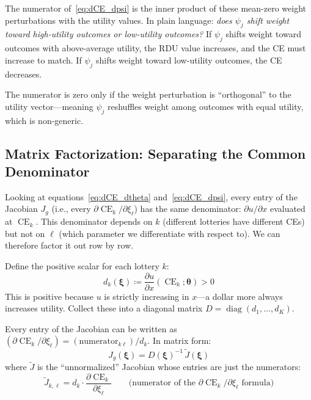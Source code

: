 \documentclass[11pt,a4paper]{article}
\theoremstyle{definition}
\newcommand{\btheta}{\boldsymbol{\theta}}
\newcommand{\bxi}{\boldsymbol{\xi}}
\DeclareMathOperator{\CE}{CE}
\DeclareMathOperator{\diag}{diag}
\begin{document}
The numerator of~\eqref{eq:dCE_dpsi} is the inner product of these
mean-zero weight perturbations with the utility values. In plain language:
\emph{does $\psi_j$ shift weight toward high-utility outcomes or low-utility
outcomes?} If $\psi_j$ shifts weight toward outcomes with above-average
utility, the RDU value increases, and the CE must increase to match. If
$\psi_j$ shifts weight toward low-utility outcomes, the CE decreases.

The numerator is zero only if the weight perturbation is ``orthogonal'' to
the utility vector---meaning $\psi_j$ reshuffles weight among outcomes with
equal utility, which is non-generic.


\subsection{Matrix Factorization: Separating the Common Denominator}

Looking at equations~\eqref{eq:dCE_dtheta} and~\eqref{eq:dCE_dpsi}, every
entry of the Jacobian $J_g$ (i.e., every $\partial \CE_k / \partial \xi_\ell$)
has the same denominator: $\partial u / \partial x$ evaluated at $\CE_k$.
This denominator depends on $k$ (different lotteries have different CEs) but
not on $\ell$ (which parameter we differentiate with respect to). We can
therefore factor it out row by row.

Define the positive scalar for each lottery $k$:
\begin{equation}
    d_k(\bxi) \coloneqq \frac{\partial u}{\partial x}(\CE_k; \btheta) > 0
\end{equation}
This is positive because $u$ is strictly increasing in $x$---a dollar more
always increases utility. Collect these into a diagonal matrix
$D = \diag(d_1, \ldots, d_K)$.

Every entry of the Jacobian can be written as
$(\partial \CE_k / \partial \xi_\ell) = (\text{numerator}_{k\ell}) / d_k$.
In matrix form:
\begin{equation}
    \label{eq:factorization}
    J_g(\bxi) = D(\bxi)^{-1} \, \widetilde{J}(\bxi)
\end{equation}
where $\widetilde{J}$ is the ``unnormalized'' Jacobian whose entries are just
the numerators:
\begin{equation}
    \widetilde{J}_{k,\ell} = d_k \cdot \frac{\partial \CE_k}{\partial \xi_\ell}
    \qquad\text{(numerator of the $\partial\CE_k / \partial\xi_\ell$ formula)}
\end{equation}
\end{document}
